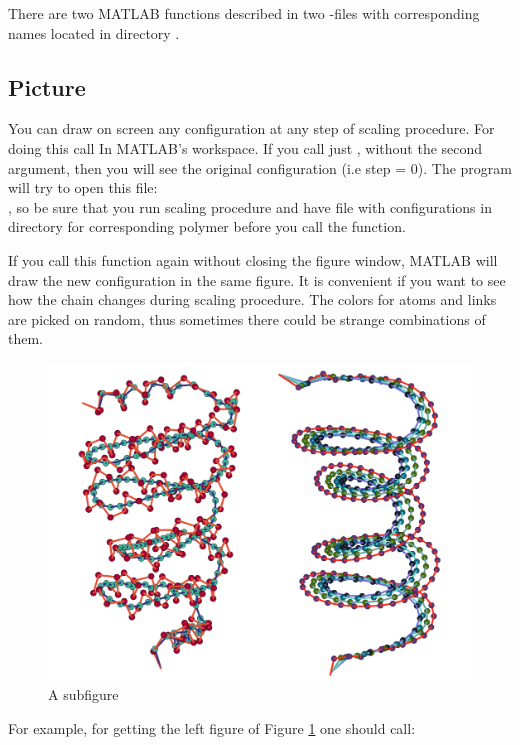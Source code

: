 \documentclass[12pt]{article}
\begin{document}
\begin{mySection}\label{sec:matlab}
There are two MATLAB functions described in two -files  with corresponding names located in directory  .
\subsection{Picture}
You can draw on screen any configuration at any step of scaling procedure. For doing this call  
In MATLAB's workspace. If you call just , without the second argument, then you will see the original configuration (i.e step = 0). 
The program will try to open this file:\\
,
so be sure that you run scaling procedure and have file with configurations in  directory for corresponding polymer before you call the function.

If you call this function again without closing the figure window, MATLAB will draw the new configuration in the same figure. It is convenient if you want to see how the chain changes during scaling procedure. The colors for atoms and links are picked on random, thus sometimes there could be strange combinations of them.
\begin{figure}[H]
	\centering
	\vskip -0cm 
  	\includegraphics[width=0.7\linewidth]{scaling.pdf}
  	\caption{A subfigure}
	\label{fig:scaling}
\end{figure}
For example, for getting the left figure of Figure \ref{fig:scaling} one should call:\\
 \\


\end{mySection}
\end{document}
